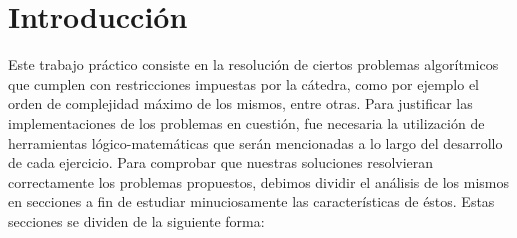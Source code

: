 \documentclass[10pt, a4paper]{article}
\author{Algoritmos y Estructuras de Datos III, DC, UBA.}
\date{}
\title{}
\begin{document}
	
\thispagestyle{empty}
\titulo{}

\maketitle

\tableofcontents
\newpage

\section{Introducci\'on}
Este trabajo práctico consiste en la resolución de ciertos problemas algorítmicos que cumplen con restricciones impuestas por la cátedra, como por ejemplo el orden de complejidad máximo de los mismos, entre otras. Para justificar las implementaciones de los problemas en cuestión, fue necesaria la utilización de herramientas lógico-matemáticas que serán mencionadas a lo largo del desarrollo de cada ejercicio.\newline
Para comprobar que nuestras soluciones resolvieran correctamente los problemas propuestos, debimos dividir el análisis de los mismos en secciones a fin de estudiar minuciosamente las características de éstos. Estas secciones se dividen de la siguiente forma:\newline
\end{document}
